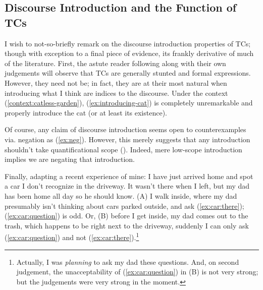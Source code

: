 \documentclass[11pt]{article}
\begin{document}
\subsection{Discourse Introduction and the Function of TCs}\label{sec:discourse-introduction}
I wish to not-so-briefly remark on the discourse introduction properties of TCs; though with exception to a final piece of evidence, its frankly derivative of much of the literature. First, the astute reader following along with their own judgements will observe that TCs are generally stunted and formal expressions. However, they need not be; in fact, they are at their most natural when introducing what I think are indices to the discourse. Under the context (\ref{context:catless-garden}), (\ref{ex:introducing-cat}) is completely unremarkable and properly introduce the cat (or at least its existence).

\begin{exe}
	\label{context:catless-garden}
	\label{ex:introducing-cat}
\end{exe}

Of course, any claim of discourse introduction seems open to counterexamples via. negation as (\ref{ex:neg}). However, this merely suggests that any introduction shouldn't take quantificational scope (\cite[p.~107]{mcnallyInterpretationEnglishExistential1992}). Indeed, mere low-scope introduction implies we are negating that introduction.

\begin{exe}
	\label{ex:neg}
\end{exe}

Finally, adapting a recent experience of mine: I have just arrived home and spot a car I don't recognize in the driveway. It wasn't there when I left, but my dad has been home all day so he should know. (A) I walk inside, where my dad presumably isn't thinking about cars parked outside, and ask (\ref{ex:car:there}); (\ref{ex:car:question}) is odd. Or, (B) before I get inside, my dad comes out to the trash, which happens to be right next to the driveway, suddenly I can only ask (\ref{ex:car:question}) and not (\ref{ex:car:there}).\footnote{Actually, I was \textit{planning} to ask my dad these questions. And, on second judgement, the unacceptability of (\ref{ex:car:question}) in (B) is not very strong; but the judgements were very strong in the moment.}
\end{document}
